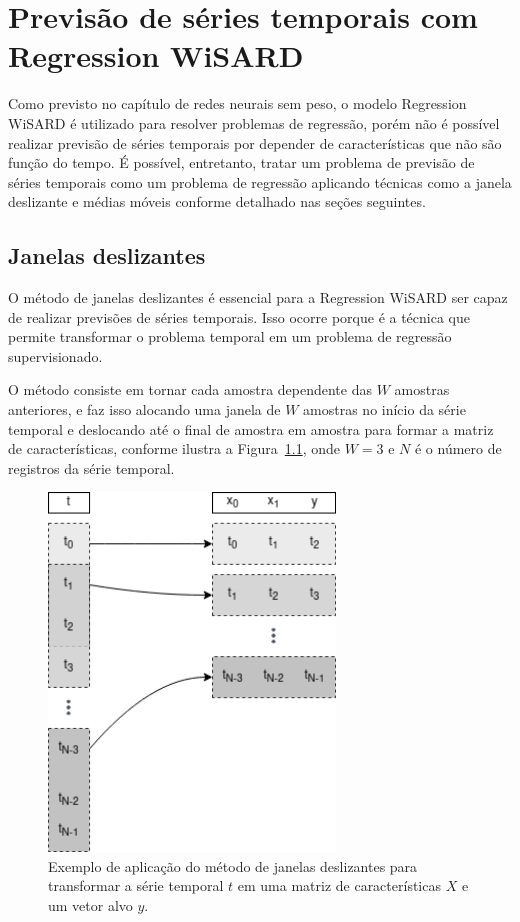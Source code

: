 \chapter{Previsão de séries temporais com Regression WiSARD}
Como previsto no capítulo de redes neurais sem peso, o modelo Regression WiSARD é utilizado para resolver problemas de regressão, porém não é possível realizar previsão de séries temporais por depender de características que não são função do tempo. É possível, entretanto, tratar um problema de previsão de séries temporais como um problema de regressão aplicando técnicas como a janela deslizante e médias móveis conforme detalhado nas seções seguintes.

\section{Janelas deslizantes}
O método de janelas deslizantes é essencial para a Regression WiSARD ser capaz de realizar previsões de séries temporais. Isso ocorre porque é a técnica que permite transformar o problema temporal em um problema de regressão supervisionado.

O método consiste em tornar cada amostra dependente das $W$ amostras anteriores, e faz isso alocando uma janela de $W$ amostras no início da série temporal e deslocando até o final de amostra em amostra para formar a matriz de características, conforme ilustra a Figura~\ref{fig:sliding_window}, onde $W=3$ e $N$ é o número de registros da série temporal.

    \begin{figure}[!ht] \label{fig:sliding_window}
    \centering
    \includegraphics[width=3.0in]{img/sliding_window.png}
    \caption{Exemplo de aplicação do método de janelas deslizantes para transformar a série temporal $t$ em uma matriz de características $X$ e um vetor alvo $y$. }
    \end{figure}

